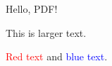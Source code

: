 \documentclass{article}
\begin{document}
\noindent
Hello, PDF!

\Large This is larger text.

\normalsize
\textcolor{red}{Red text} and \textcolor{blue}{blue text}.
\end{document}

